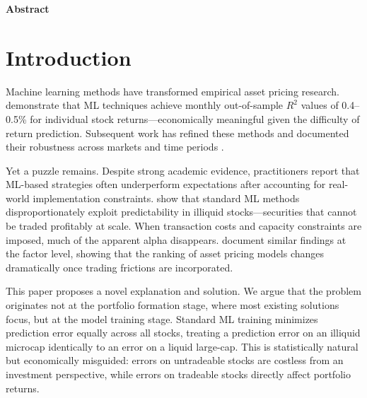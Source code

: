 \documentclass[a4paper,12pt,final]{article}
\begin{document}
\date{\hspace{2em}}

\maketitle

\vspace*{0.1in}
\centerline{\bf Abstract}
\medskip
\abs
\normalsize
\setlength{\parskip}{.2cm}
\setlength{\parindent}{0.55cm}

\doublespacing

\clearpage


\section{Introduction}
\label{sec:introduction}

Machine learning methods have transformed empirical asset pricing research. \citet{gu2020empirical} demonstrate that ML techniques achieve monthly out-of-sample $R^2$ values of 0.4--0.5\% for individual stock returns---economically meaningful given the difficulty of return prediction. Subsequent work has refined these methods and documented their robustness across markets and time periods \citep{kelly2019characteristics,chen2022open}.

Yet a puzzle remains. Despite strong academic evidence, practitioners report that ML-based strategies often underperform expectations after accounting for real-world implementation constraints. \citet{avramov2023machine} show that standard ML methods disproportionately exploit predictability in illiquid stocks---securities that cannot be traded profitably at scale. When transaction costs and capacity constraints are imposed, much of the apparent alpha disappears. \citet{theis2024model} document similar findings at the factor level, showing that the ranking of asset pricing models changes dramatically once trading frictions are incorporated.

This paper proposes a novel explanation and solution. We argue that the problem originates not at the portfolio formation stage, where most existing solutions focus, but at the model training stage. Standard ML training minimizes prediction error equally across all stocks, treating a prediction error on an illiquid microcap identically to an error on a liquid large-cap. This is statistically natural but economically misguided: errors on untradeable stocks are costless from an investment perspective, while errors on tradeable stocks directly affect portfolio returns.
\end{document}

